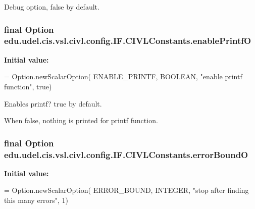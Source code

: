 Debug option, false by default. 

\hypertarget{classedu_1_1udel_1_1cis_1_1vsl_1_1civl_1_1config_1_1IF_1_1CIVLConstants_aba6c0773f174ac810556348dce16beae}{}
\subsubsection[{enable\+Printf\+O}]{\setlength{\rightskip}{0pt plus 5cm}final Option edu.\+udel.\+cis.\+vsl.\+civl.\+config.\+I\+F.\+C\+I\+V\+L\+Constants.\+enable\+Printf\+O\hspace{0.3cm}{\ttfamily [static]}}\label{classedu_1_1udel_1_1cis_1_1vsl_1_1civl_1_1config_1_1IF_1_1CIVLConstants_aba6c0773f174ac810556348dce16beae}
{\bfseries Initial value\+:}
\begin{DoxyCode}
= Option.newScalarOption(
            ENABLE\_PRINTF, BOOLEAN, \textcolor{stringliteral}{"enable printf function"}, \textcolor{keyword}{true})
\end{DoxyCode}


Enables printf? true by default. 

When false, nothing is printed for printf function. \hypertarget{classedu_1_1udel_1_1cis_1_1vsl_1_1civl_1_1config_1_1IF_1_1CIVLConstants_ad8aeff5d4b29610b76fc8fea9065c029}{}
\subsubsection[{error\+Bound\+O}]{\setlength{\rightskip}{0pt plus 5cm}final Option edu.\+udel.\+cis.\+vsl.\+civl.\+config.\+I\+F.\+C\+I\+V\+L\+Constants.\+error\+Bound\+O\hspace{0.3cm}{\ttfamily [static]}}\label{classedu_1_1udel_1_1cis_1_1vsl_1_1civl_1_1config_1_1IF_1_1CIVLConstants_ad8aeff5d4b29610b76fc8fea9065c029}
{\bfseries Initial value\+:}
\begin{DoxyCode}
= Option.newScalarOption(
            ERROR\_BOUND, INTEGER, \textcolor{stringliteral}{"stop after finding this many errors"}, 1)
\end{DoxyCode}


